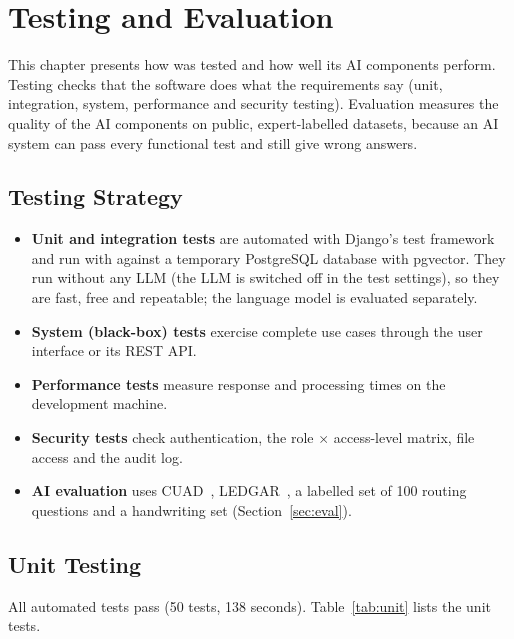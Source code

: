 \chapter{Testing and Evaluation}
This chapter presents how \sysname{} was tested and how well its AI components perform. Testing
checks that the software does what the requirements say (unit, integration, system, performance and
security testing). Evaluation measures the quality of the AI components on public, expert-labelled
datasets, because an AI system can pass every functional test and still give wrong answers.

\section{Testing Strategy}
\begin{itemize}
\item \textbf{Unit and integration tests} are automated with Django's test framework and run with
 against a temporary PostgreSQL database with pgvector. They run without any
LLM (the LLM is switched off in the test settings), so they are fast, free and repeatable; the language
model is evaluated separately.
\item \textbf{System (black-box) tests} exercise complete use cases through the user interface or its REST API.
\item \textbf{Performance tests} measure response and processing times on the development machine.
\item \textbf{Security tests} check authentication, the role $\times$ access-level matrix, file access and
the audit log.
\item \textbf{AI evaluation} uses CUAD~\cite{hendrycks2021cuad}, LEDGAR~\cite{tuggener2020ledgar}, a
labelled set of 100 routing questions and a handwriting set (Section~\ref{sec:eval}).
\end{itemize}

\section{Unit Testing}
All automated tests pass (50 tests, 138 seconds). Table~\ref{tab:unit} lists the unit tests.

